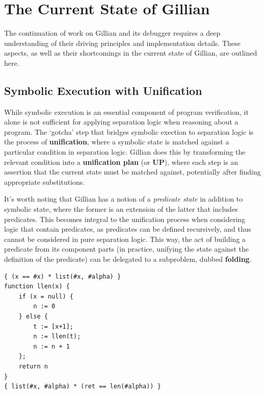 
\chapter{The Current State of Gillian}\label{sec:current}

The continuation of work on Gillian and its debugger requires a deep
understanding of their driving principles and implementation details.
These aspects, as well as their shortcomings in the current state of Gillian,
are outlined here.

\section{Symbolic Execution with Unification}\label{sec:current:symex}


While symbolic execution is an essential component of program verification, it
alone is not sufficient for applying separation logic when reasoning about a
program. The `gotcha' step that bridges symbolic exection to separation logic is
the process of \textbf{unification}, where a symbolic state is matched against a
particular condition in separation logic. Gillian does this by transforming the
relevant condition into a \textbf{unification plan} (or \textbf{UP}), where each
step is an assertion that the current state must be matched against, potentially
after finding appropriate substitutions.

It's worth noting that Gillian has a notion of a \textit{predicate state} in
addition to symbolic state, where the former is an extension of the latter that
includes predicates. This becomes integral to the unification process when
considering logic that contain predicates, as predicates can be defined
recursively, and thus cannot be considered in pure separation logic. This way,
the act of building a predicate from its component parts (in practice, unifying
the state against the definition of the predicate) can be delegated to a
subproblem, dubbed \textbf{folding}.

\begin{lstlisting}[caption={
  The recursive list length function, in WISL
  \label{lst:llen-rec}}, style=code]
{ (x == #x) * list(#x, #alpha) }
function llen(x) {
    if (x = null) {
        n := 0
    } else {
        t := [x+1];
        n := llen(t);
        n := n + 1
    };
    return n
}
{ list(#x, #alpha) * (ret == len(#alpha)) }
\end{lstlisting}

